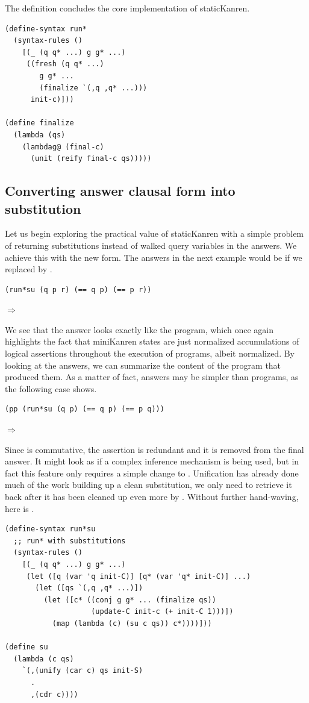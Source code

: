 The definition  concludes the core implementation of staticKanren.
\begin{lstlisting}
(define-syntax run*
  (syntax-rules ()
    [(_ (q q* ...) g g* ...)
     ((fresh (q q* ...)
        g g* ...
        (finalize `(,q ,q* ...)))
      init-c)]))

(define finalize
  (lambda (qs)
    (lambdag@ (final-c)
      (unit (reify final-c qs)))))
\end{lstlisting}

\subsection{Converting answer clausal form into  substitution}\label{S}
Let us begin exploring the practical value of staticKanren with a simple problem of returning substitutions instead of walked query variables in the answers. We achieve this with the new  form. The answers in the next example would be  if we replaced  by .
\begin{lstlisting}
(run*su (q p r) (== q p) (== p r))
\end{lstlisting}
$\Rightarrow$ 

We see that the answer looks exactly like the program, which once again highlights the fact that miniKanren states are just normalized accumulations of logical assertions throughout the execution of programs, albeit normalized. By looking at the answers, we can summarize the content of the program that produced them. As a matter of fact, answers may be simpler than programs, as the following case shows.
\begin{lstlisting}
(pp (run*su (q p) (== q p) (== p q)))
\end{lstlisting}
$\Rightarrow$ 

Since \code{==} is commutative, the assertion  is redundant and it is removed from the final answer. It might look as if a complex inference mechanism is being used, but in fact this feature only requires a simple change to . Unification has already done much of the work building up a clean substitution, we only need to retrieve it back after it has been cleaned up even more by . Without further hand-waving, here is .
\begin{lstlisting}
(define-syntax run*su
  ;; run* with substitutions
  (syntax-rules ()
    [(_ (q q* ...) g g* ...)
     (let ([q (var 'q init-C)] [q* (var 'q* init-C)] ...)
       (let ([qs `(,q ,q* ...)])
         (let ([c* ((conj g g* ... (finalize qs))
                    (update-C init-c (+ init-C 1)))])
           (map (lambda (c) (su c qs)) c*))))]))

(define su
  (lambda (c qs)
    `(,(unify (car c) qs init-S)
      .
      ,(cdr c))))
\end{lstlisting}

